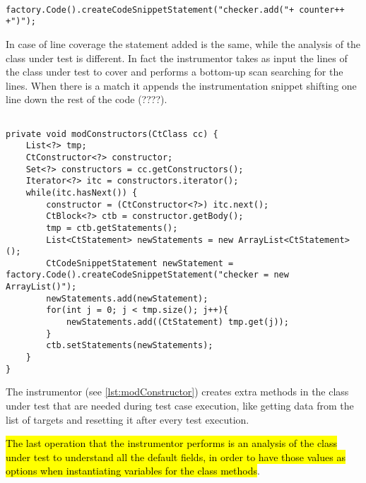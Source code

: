 \begin{minipage}{\linewidth}
\begin{lstlisting}[caption={Snippet creation},label={lst:addSnippet}]% Start your code-block
	
factory.Code().createCodeSnippetStatement("checker.add("+ counter++ +")");
\end{lstlisting}
\end{minipage}

In case of line coverage the statement added is the same, while the analysis of the class under test is different. In fact the instrumentor takes as input the lines of the class under test to cover and performs a bottom-up scan searching for the lines. When there is a match it appends the instrumentation snippet shifting one line down the rest of the code (????).

\begin{minipage}{\linewidth}
\begin{lstlisting}[caption={The function to add the ArrayList instantiation snippet},label={lst:modConstructor}]% Start your code-block

private void modConstructors(CtClass cc) {
	List<?> tmp;
	CtConstructor<?> constructor;
	Set<?> constructors = cc.getConstructors();
	Iterator<?> itc = constructors.iterator();
	while(itc.hasNext()) {
		constructor = (CtConstructor<?>) itc.next();
		CtBlock<?> ctb = constructor.getBody();
		tmp = ctb.getStatements();
		List<CtStatement> newStatements = new ArrayList<CtStatement>();
		CtCodeSnippetStatement newStatement = factory.Code().createCodeSnippetStatement("checker = new ArrayList()");
		newStatements.add(newStatement);
		for(int j = 0; j < tmp.size(); j++){
			newStatements.add((CtStatement) tmp.get(j));
		}
		ctb.setStatements(newStatements);
	}
}
\end{lstlisting}
\end{minipage}

The instrumentor (see \autoref{lst:modConstructor})
creates extra methods in the class under test that are needed during test case execution, like getting data from the list of targets and resetting it after  every test execution.

\hl{The last operation that the instrumentor performs is an analysis of the class under test to understand all the default fields, in order to have those values as options when instantiating variables for the class methods}.